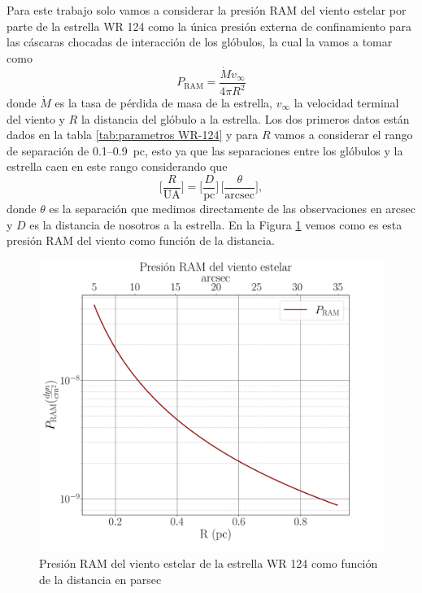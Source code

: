 \documentclass{book}
\begin{document}
Para este trabajo solo vamos a considerar la presión RAM del viento estelar por parte de la estrella WR 124 como la única presión externa de confinamiento para las cáscaras chocadas de interacción de los glóbulos, la cual la vamos a tomar como \begin{equation}
 P_\mathrm{RAM}= \frac{\dot{M}v_\infty}{4\pi R^2}    
\end{equation}
donde $\dot{M}$ es la tasa de pérdida de masa de la estrella, $v_\infty$ la velocidad terminal del viento y $R$ la distancia del glóbulo a la estrella. Los dos primeros datos están dados en la tabla \ref{tab:parametros WR-124} y para $R$ vamos a considerar el rango de separación de 0.1--\SI{0.9}{pc}, esto ya que las separaciones entre los glóbulos y la estrella caen en este rango considerando que
\begin{equation}
    \Big[\frac{R}{\mathrm{UA}}\Big] = \Big[\frac{D}{\mathrm{pc}}\Big]\,\Big[\frac{\theta}{\mathrm{arcsec}}\Big],
\end{equation}
donde $\theta$ es la separación que medimos directamente de las observaciones en arcsec y $D$ es la distancia de nosotros a la estrella. En la Figura \ref{P_RAM} vemos como es esta presión RAM del viento como función de la distancia.

\begin{figure}[htb]
    \centering    \includegraphics[width=\textwidth]{Nuevas imagenes finales/PRAMcgs_n.pdf}
    \caption{Presión RAM del viento estelar de la estrella WR 124 como función de la distancia en parsec}
    \label{P_RAM}
\end{figure}
\end{document}

